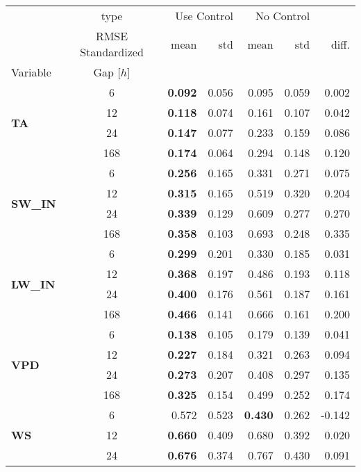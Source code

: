 \begin{table}
\centering
\caption{\CapControl}
\label{control}
\begin{tabular}{p{2.1cm}c|rr|rr|r}
\toprule
 & type & \multicolumn{2}{r}{Use Control} & \multicolumn{2}{r}{No Control} &  \\
 & RMSE Standardized & mean & std & mean & std & diff. \\
Variable & Gap [$h$] &  &  &  &  &  \\
\midrule
\multirow[c]{4}{*}{\parbox{2.1cm}{\textbf{TA}}} & 6 & \bfseries 0.092 & 0.056 & 0.095 & 0.059 & 0.002 \\
 & 12 & \bfseries 0.118 & 0.074 & 0.161 & 0.107 & 0.042 \\
 & 24 & \bfseries 0.147 & 0.077 & 0.233 & 0.159 & 0.086 \\
 & 168 & \bfseries 0.174 & 0.064 & 0.294 & 0.148 & 0.120 \\
\cline{1-7}
\multirow[c]{4}{*}{\parbox{2.1cm}{\textbf{SW\_IN}}} & 6 & \bfseries 0.256 & 0.165 & 0.331 & 0.271 & 0.075 \\
 & 12 & \bfseries 0.315 & 0.165 & 0.519 & 0.320 & 0.204 \\
 & 24 & \bfseries 0.339 & 0.129 & 0.609 & 0.277 & 0.270 \\
 & 168 & \bfseries 0.358 & 0.103 & 0.693 & 0.248 & 0.335 \\
\cline{1-7}
\multirow[c]{4}{*}{\parbox{2.1cm}{\textbf{LW\_IN}}} & 6 & \bfseries 0.299 & 0.201 & 0.330 & 0.185 & 0.031 \\
 & 12 & \bfseries 0.368 & 0.197 & 0.486 & 0.193 & 0.118 \\
 & 24 & \bfseries 0.400 & 0.176 & 0.561 & 0.187 & 0.161 \\
 & 168 & \bfseries 0.466 & 0.141 & 0.666 & 0.161 & 0.200 \\
\cline{1-7}
\multirow[c]{4}{*}{\parbox{2.1cm}{\textbf{VPD}}} & 6 & \bfseries 0.138 & 0.105 & 0.179 & 0.139 & 0.041 \\
 & 12 & \bfseries 0.227 & 0.184 & 0.321 & 0.263 & 0.094 \\
 & 24 & \bfseries 0.273 & 0.207 & 0.408 & 0.297 & 0.135 \\
 & 168 & \bfseries 0.325 & 0.154 & 0.499 & 0.252 & 0.174 \\
\cline{1-7}
\multirow[c]{4}{*}{\parbox{2.1cm}{\textbf{WS}}} & 6 & 0.572 & 0.523 & \bfseries 0.430 & 0.262 & -0.142 \\
 & 12 & \bfseries 0.660 & 0.409 & 0.680 & 0.392 & 0.020 \\
 & 24 & \bfseries 0.676 & 0.374 & 0.767 & 0.430 & 0.091 \\

\end{tabular}
\end{table}
